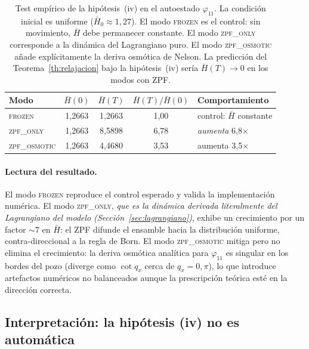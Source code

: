 \documentclass[11pt,a4paper]{article}
\begin{document}
\begin{table}[h]
\centering
\caption{Test empírico de la hipótesis~(iv) en el autoestado
$\varphi_{11}$. La condición inicial es uniforme
($\bar{H}_0\approx 1{,}27$). El modo \textsc{frozen} es el control: sin
movimiento, $\bar{H}$ debe permanecer constante. El modo
\textsc{zpf\_only} corresponde a la dinámica del Lagrangiano puro. El
modo \textsc{zpf\_osmotic} añade explícitamente la deriva osmótica de
Nelson. La predicción del Teorema~\ref{th:relajacion} bajo la
hipótesis~(iv) sería $\bar{H}(T)\to 0$ en los modos con ZPF.}
\label{tab:test_hipotesis_iv}
\begin{tabular}{lcccl}
\toprule
Modo & $\bar{H}(0)$ & $\bar{H}(T)$ & $\bar{H}(T)/\bar{H}(0)$ & Comportamiento \\
\midrule
\textsc{frozen}      & 1{,}2663 & 1{,}2663 & 1{,}00 & control: $\bar{H}$ constante \\
\textsc{zpf\_only}   & 1{,}2663 & 8{,}5898 & 6{,}78 & \emph{aumenta} 6,8$\times$ \\
\textsc{zpf\_osmotic}& 1{,}2663 & 4{,}4680 & 3{,}53 & aumenta 3,5$\times$        \\
\bottomrule
\end{tabular}
\end{table}

\paragraph{Lectura del resultado.}
El modo \textsc{frozen} reproduce el control esperado y valida la
implementación numérica. El modo \textsc{zpf\_only}, \emph{que es la
dinámica derivada literalmente del Lagrangiano del modelo
(Sección~\ref{sec:lagrangiano})}, exhibe un crecimiento por un factor
$\sim 7$ en $\bar{H}$: el ZPF difunde el ensamble hacia la
distribución uniforme, contra-direccional a la regla de Born. El modo
\textsc{zpf\_osmotic} mitiga pero no elimina el crecimiento: la deriva
osmótica analítica para $\varphi_{11}$ es singular en los bordes del
pozo (diverge como $\cot q_x$ cerca de $q_x=0,\pi$), lo que introduce
artefactos numéricos no balanceados aunque la prescripción teórica
esté en la dirección correcta.

\subsection{Interpretación: la hipótesis (iv) no es automática}
\label{sec:interpretacion_iv}
\end{document}
